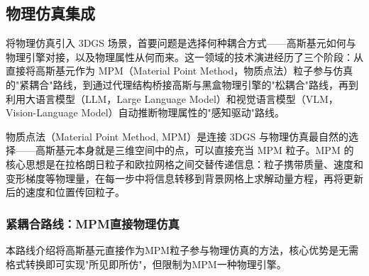 \subsection{物理仿真集成}

将物理仿真引入 3DGS 场景，首要问题是选择何种耦合方式——高斯基元如何与物理引擎对接，以及物理属性从何而来。这一领域的技术演进经历了三个阶段：从直接将高斯基元作为 MPM（Material Point Method，物质点法）粒子参与仿真的"紧耦合"路线，到通过代理结构桥接高斯与黑盒物理引擎的"松耦合"路线，再到利用大语言模型（LLM，Large Language Model）和视觉语言模型（VLM，Vision-Language Model）自动推断物理属性的"感知驱动"路线。

\begin{table}[htbp]
\centering
\caption{3DGS 物理仿真方法对比}
\label{tab:07_physics_methods}
\end{table}

物质点法（Material Point Method, MPM）是连接 3DGS 与物理仿真最自然的选择——高斯基元本身就是三维空间中的点，可以直接充当 MPM 粒子。MPM 的核心思想是在拉格朗日粒子和欧拉网格之间交替传递信息：粒子携带质量、速度和变形梯度等物理量，在每一步中将信息转移到背景网格上求解动量方程，再将更新后的速度和位置传回粒子。

\subsubsection{紧耦合路线：MPM直接物理仿真}

本路线介绍将高斯基元直接作为MPM粒子参与物理仿真的方法，核心优势是无需格式转换即可实现"所见即所仿"，但限制为MPM一种物理引擎。

